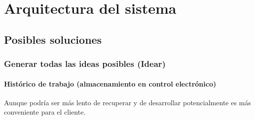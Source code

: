 \chapter{Arquitectura del sistema}

\section{Posibles soluciones}

\subsection{Generar todas las ideas posibles (Idear)}

\subsubsection{Histórico de trabajo (almacenamiento en control electrónico)}

Aunque podría ser más lento de recuperar y de desarrollar potencialmente
es más conveniente para el cliente.

